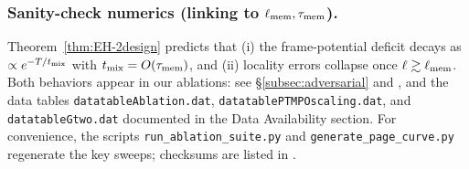 \documentclass[aps,prd,preprint,onecolumn,superscriptaddress,nofootinbib,longbibliography,floatfix,11pt,showpacs,showkeys]{revtex4-2}
\theoremstyle{plain}
\theoremstyle{definition}
\theoremstyle{remark}
\begin{document}
\subsubsection{Sanity-check numerics (linking to $\ell_{\rm mem},\tau_{\rm mem}$).}
Theorem~\ref{thm:EH-2design} predicts that (i) the frame-potential deficit decays as $\propto e^{-T/t_{\rm mix}}$ with $t_{\rm mix}=O(\tau_{\rm mem})$, and (ii) locality errors collapse once $\ell\gtrsim\ell_{\rm mem}$.
Both behaviors appear in our ablations: see \S\ref{subsec:adversarial} and , and the data tables
\texttt{datatableAblation.dat}, \texttt{datatablePTMPOscaling.dat}, and \texttt{datatableGtwo.dat} documented in the Data Availability section.
For convenience, the scripts \texttt{run\_ablation\_suite.py} and \texttt{generate\_page\_curve.py} regenerate the key sweeps;
checksums are listed in .
\end{document}
